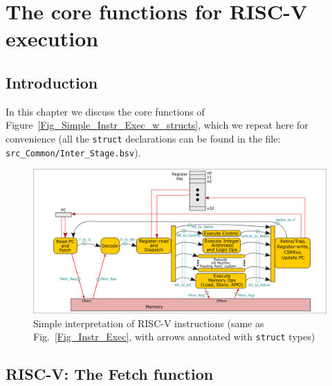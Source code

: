 

\chapter{The core functions for RISC-V execution}


\setcounter{page}{1}
\renewcommand{\thepage}{\arabic{chapter}-\arabic{page}}

\label{ch_core_functions}


\section{Introduction}

In this chapter we discuss the core functions of
Figure~\ref{Fig_Simple_Instr_Exec_w_structs}, which we repeat here for
convenience (all the \verb|struct| declarations can be found in the
file: \verb|src_Common/Inter_Stage.bsv|).
\begin{figure}[htbp]
  \centerline{\includegraphics[width=6in,angle=0]{ch030_RISCV_Design_Space/Figures/Fig_Instr_Exec_w_structs}}
  \caption{\label{Fig_Fetch_function_Simple_Instr_Exec}
           Simple interpretation of RISC-V instructions
	   (same as Fig.~\ref{Fig_Instr_Exec}, with arrows annotated with {\tt struct} types)}
\end{figure}


\section{RISC-V: The Fetch function}

